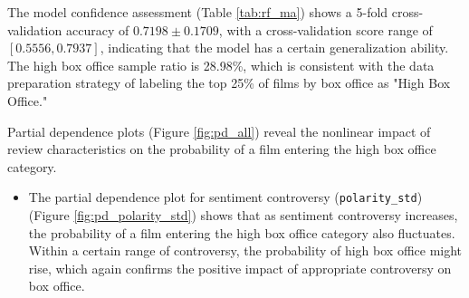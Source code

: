 \documentclass{article}
\begin{document}
The model confidence assessment (Table \ref{tab:rf_ma}) shows a 5-fold cross-validation accuracy of $0.7198 \pm 0.1709$, with a cross-validation score range of $[0.5556, 0.7937]$, indicating that the model has a certain generalization ability. The high box office sample ratio is 28.98\%, which is consistent with the data preparation strategy of labeling the top 25\% of films by box office as "High Box Office."

Partial dependence plots (Figure \ref{fig:pd_all}) reveal the nonlinear impact of review characteristics on the probability of a film entering the high box office category.
\begin{itemize}
\item The partial dependence plot for sentiment controversy (\texttt{polarity\_std}) (Figure \ref{fig:pd_polarity_std}) shows that as sentiment controversy increases, the probability of a film entering the high box office category also fluctuates. Within a certain range of controversy, the probability of high box office might rise, which again confirms the positive impact of appropriate controversy on box office.
\end{itemize}

\end{document}
